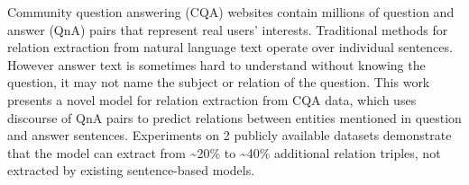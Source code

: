 Community question answering (CQA) websites contain millions of question and answer (QnA) pairs that represent real users' interests. Traditional methods for relation extraction from natural language text operate over individual sentences. However answer text is sometimes hard to understand without knowing the question, \eg it may not name the subject or relation of the question. This work presents a novel model for relation extraction from CQA data, which uses discourse of QnA pairs to predict relations between entities mentioned in question and answer sentences. Experiments on 2 publicly available datasets demonstrate that the model can extract from {\textasciitilde}20\% to {\textasciitilde}40\% additional relation triples, not extracted by existing sentence-based models.
